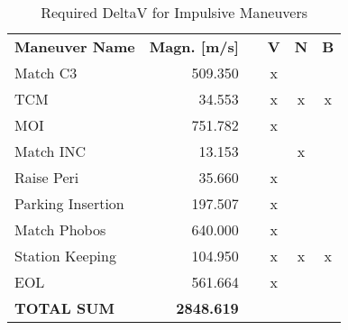 \begin{table}
\centering
\caption{Required DeltaV for Impulsive Maneuvers}
\label{tab:man-dv}
\begin{tabular}{|l|r|l|c|c|c|} 
\cline{1-2}\cline{4-6}
\multicolumn{1}{|c|}{\textbf{Maneuver Name}} & \multicolumn{1}{c|}{\textbf{ Magn. [m/s]}} &                       & \textbf{V}           & \multicolumn{1}{l|}{\textbf{N}} & \multicolumn{1}{l|}{\textbf{B}}  \\ 
\cline{1-2}\cline{4-6}
Match C3                                     & 509.350                                    &                       & x                    &                                 &                                  \\ 
\cline{1-2}\cline{4-6}
TCM                                          & 34.553                                     &                       & x                    & x                               & x                                \\ 
\cline{1-2}\cline{4-6}
MOI                                          & 751.782                                    &                       & x                    &                                 &                                  \\ 
\cline{1-2}\cline{4-6}
Match INC                                    & 13.153                                     &                       &                      & x                               &                                  \\ 
\cline{1-2}\cline{4-6}
Raise Peri                                   & 35.660                                     &                       & x                    &                                 &                                  \\ 
\cline{1-2}\cline{4-6}
Parking Insertion                            & 197.507                                    &                       & x                    &                                 &                                  \\ 
\cline{1-2}\cline{4-6}
Match Phobos                                 & 640.000                                    &                       & x                    &                                 &                                  \\ 
\cline{1-2}\cline{4-6}
Station Keeping                              & 104.950                                    & \multicolumn{1}{r|}{} & x                    & x                               & x                                \\ 
\cline{1-2}\cline{4-6}
EOL                                          & 561.664                                    &                       & x                    &                                 &                                  \\ 
\cline{1-2}\cline{4-6}
\textbf{TOTAL SUM}                           & \textbf{2848.619}                          & \multicolumn{1}{l}{}  & \multicolumn{1}{l}{} & \multicolumn{1}{l}{}            & \multicolumn{1}{l}{}             \\
\cline{1-2}
\end{tabular}
\end{table}


